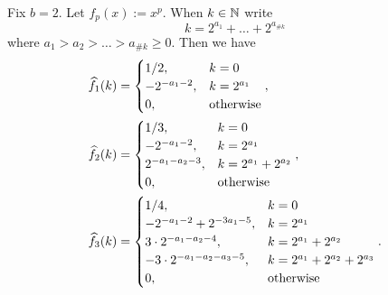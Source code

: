 \documentclass[acmsmall]{acmart}
\begin{document}
\begin{lemma}\label{lemma:walsh_low_order_monomials}
    Fix $b=2$. Let $f_p(x) := x^p$. When $k \in {\mathbb{N}}$ write 
    $$k = 2^{a_1}+\dots+2^{a_{\#k}}$$
    where $a_1 > a_2 > \dots > a_{\#k} \geq 0$. Then we have 
    \begin{align*}
        {\widehat{f}}_1(k) &= \begin{cases} 1/2, & k = 0 \\ -2^{-a_1-2}, & k=2^{a_1} \\ 0, & \mathrm{otherwise} \end{cases}, \\
        {\widehat{f}}_2(k) &= \begin{cases} 1/3, & k = 0 \\ -2^{-a_1-2}, & k=2^{a_1} \\ 2^{-a_1-a_2-3}, & k = 2^{a_1}+2^{a_2} \\ 0, & \mathrm{otherwise} \end{cases}, \\
        {\widehat{f}}_3(k) &= \begin{cases} 1/4, & k=0 \\ -2^{-a_1-2} + 2^{-3a_1-5}, & k = 2^{a_1} \\ 3 \cdot 2^{-a_1-a_2-4}, & k=2^{a_1}+2^{a_2} \\ -3 \cdot 2^{-a_1-a_2-a_3-5}, & k=2^{a_1}+2^{a_2}+2^{a_3} \\ 0, & \mathrm{otherwise} \end{cases}.
    \end{align*}
\end{lemma}
\end{document}
